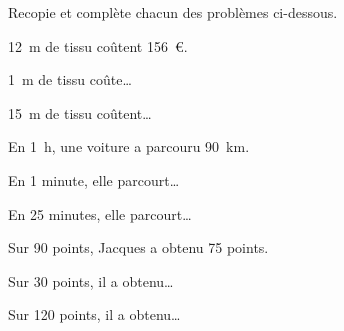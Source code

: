 Recopie et complète chacun des problèmes ci-dessous.
\begin{multicols}{3}
  \begin{myenumerate}
  \item 12~m de tissu coûtent 156~\textgreek{\euro}.\par 1~m de tissu
coûte\ldots\par 15~m de tissu coûtent\ldots
\par\columnbreak\par
  \item En 1~h, une voiture a parcouru 90~km.\par En 1 minute, elle
parcourt\ldots\par En 25 minutes, elle parcourt\ldots
\par\columnbreak\par
  \item Sur 90 points, Jacques a obtenu 75 points.\par Sur 30 points,
il a obtenu\ldots\par Sur 120 points, il a obtenu\ldots
  \end{myenumerate}
\end{multicols}